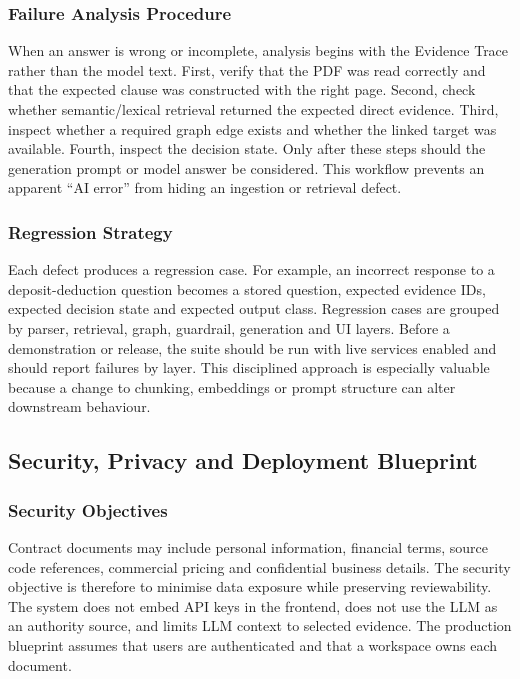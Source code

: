\documentclass[12pt,a4paper,oneside]{report}
\begin{document}
\subsubsection{Failure Analysis Procedure}
When an answer is wrong or incomplete, analysis begins with the Evidence Trace rather than the model text. First, verify that the PDF was read correctly and that the expected clause was constructed with the right page. Second, check whether semantic/lexical retrieval returned the expected direct evidence. Third, inspect whether a required graph edge exists and whether the linked target was available. Fourth, inspect the decision state. Only after these steps should the generation prompt or model answer be considered. This workflow prevents an apparent ``AI error'' from hiding an ingestion or retrieval defect.

\subsubsection{Regression Strategy}
Each defect produces a regression case. For example, an incorrect response to a deposit-deduction question becomes a stored question, expected evidence IDs, expected decision state and expected output class. Regression cases are grouped by parser, retrieval, graph, guardrail, generation and UI layers. Before a demonstration or release, the suite should be run with live services enabled and should report failures by layer. This disciplined approach is especially valuable because a change to chunking, embeddings or prompt structure can alter downstream behaviour.


\subsection{Security, Privacy and Deployment Blueprint}

\subsubsection{Security Objectives}
Contract documents may include personal information, financial terms, source code references, commercial pricing and confidential business details. The security objective is therefore to minimise data exposure while preserving reviewability. The system does not embed API keys in the frontend, does not use the LLM as an authority source, and limits LLM context to selected evidence. The production blueprint assumes that users are authenticated and that a workspace owns each document.
\end{document}
